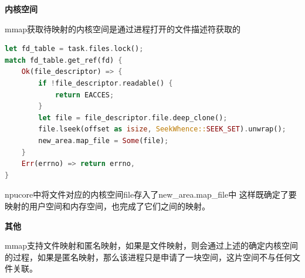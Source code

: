 \textbf{内核空间}

mmap获取待映射的内核空间是通过进程打开的文件描述符获取的
\begin{lstlisting}[language={Rust}, label={code:new_area},
	caption={os/src/mm/memory_set.rs}]
let fd_table = task.files.lock();
match fd_table.get_ref(fd) {
    Ok(file_descriptor) => {
        if !file_descriptor.readable() {
            return EACCES;
        }
        let file = file_descriptor.file.deep_clone();
        file.lseek(offset as isize, SeekWhence::SEEK_SET).unwrap();
        new_area.map_file = Some(file);
    }
    Err(errno) => return errno,
}
\end{lstlisting}
npucore中将文件对应的内核空间file存入了new\_area.map\_file中
这样既确定了要映射的用户空间和内存空间，也完成了它们之间的映射。

\textbf{其他}

mmap支持文件映射和匿名映射，如果是文件映射，则会通过上述的确定内核空间的过程，如果是匿名映射，那么该进程只是申请了一块空间，这片空间不与任何文件关联。

